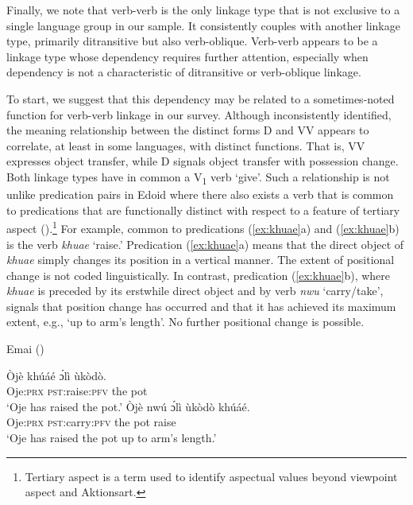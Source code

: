 \documentclass[output=paper,colorlinks,citecolor=brown]{langscibook}
\begin{document}
Finally, we note that verb-verb is the only linkage type that is not exclusive to a single language group in our sample. It consistently couples with another linkage type, primarily ditransitive but also verb-oblique. Verb-verb appears to be a linkage type whose dependency requires further attention, especially when dependency is not a characteristic of ditransitive or verb-oblique linkage.\largerpage

To start, we suggest that this dependency may be related to a sometimes-noted function for verb-verb linkage in our survey. Although inconsistently identified, the meaning relationship between the distinct forms D and VV appears to correlate, at least in some languages, with distinct functions. That is, VV expresses object transfer, while D signals object transfer with possession change. Both linkage types have in common a V\textsubscript{1} verb ‘give’. Such a relationship is not unlike predication pairs in Edoid where there also exists a verb that is common to predications that are functionally distinct with respect to a feature of tertiary aspect (\cite{DesclésGuentchéva2012}).{\footnote{Tertiary aspect is a term used to identify aspectual values beyond viewpoint aspect and Aktionsart.}} For example, common to  predications (\ref{ex:khuae}a) and (\ref{ex:khuae}b) is the verb \textit{khuae} ‘raise.’ Predication (\ref{ex:khuae}a) means that the direct object of \textit{khuae} simply changes its position in a vertical manner. The extent of positional change is not coded linguistically. In contrast, predication (\ref{ex:khuae}b), where \textit{khuae} is preceded by its erstwhile direct object and by verb \textit{nwu} ‘carry/take’, signals that position change has occurred and that it has achieved its maximum extent, e.g., ‘up to arm’s length’. No further positional change is possible.

\ea \label{ex:khuae} Emai (\citealt[732]{SchaeferEgbokhare2017})
\begin{xlist}
\ex
\gll Òjè				khúáé							ɔ́lì		ùkòdò.\\
	Oje:\textsc{prx}	\textsc{pst}:raise:\textsc{pfv}		the	pot\\
\glt						‘Oje has raised the pot.’	
\ex 	
\gll Òjè				nwú								ɔ́lì		ùkòdò	khúáé.\\
						Oje:\textsc{prx}	\textsc{pst}:carry:\textsc{pfv}	the	pot			raise\\
\glt						‘Oje has raised the pot up to arm’s length.’	
\end{xlist}
\z
\end{document}
